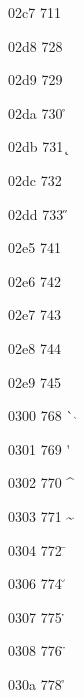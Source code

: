\documentclass[11pt]{article}
\begin{document}











02c7 711 \textasciicaron









02d8 728 \textasciibreve

02d9 729 \textperiodcentered

02da 730 \r{}

02db 731 \k{}

02dc 732 \texttildelow

02dd 733 \H{}

02e5 741 

02e6 742 

02e7 743 

02e8 744 

02e9 745 

0300 768 {\`{}} $\grave{}$

0301 769 \'{}

0302 770 \^{}

0303 771 \~{}

0304 772 \={}

0306 774 \u{}

0307 775 \.{}

0308 776 \"{}

030a 778 \r{}
\end{document}
